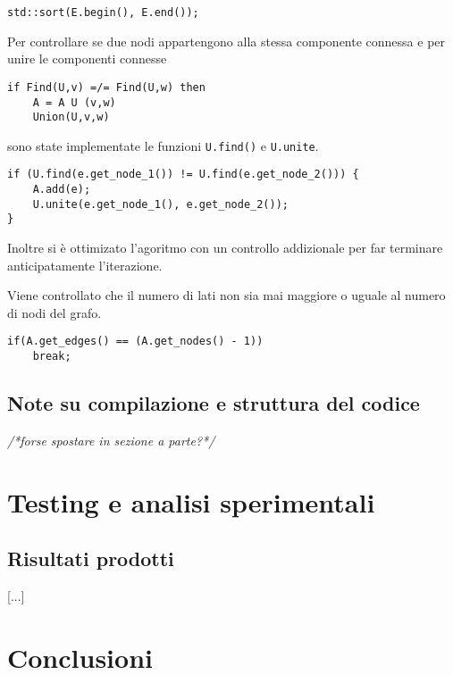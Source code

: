 \documentclass[]{article}
\begin{document}
\begin{flushleft}
\lstset{language=c++, style=mystyle, firstnumber=2} 	 	
\begin{lstlisting}
std::sort(E.begin(), E.end());
\end{lstlisting}

\medskip
Per controllare se due nodi appartengono alla stessa componente connessa e per unire le componenti connesse
\begin{lstlisting}
if Find(U,v) =/= Find(U,w) then
	A = A U (v,w)
	Union(U,v,w)
\end{lstlisting}

\smallskip
sono state implementate le funzioni \verb|U.find()| e \verb|U.unite|.

\lstset{language=c++, style=mystyle, firstnumber=2} 	 	
\begin{lstlisting}
if (U.find(e.get_node_1()) != U.find(e.get_node_2())) {
	A.add(e);
    U.unite(e.get_node_1(), e.get_node_2());
}
\end{lstlisting}

\medskip
Inoltre si è ottimizato l'agoritmo con un controllo addizionale per far terminare anticipatamente l'iterazione. 

Viene controllato che il numero di lati non sia mai maggiore o uguale al numero di nodi del grafo.

\lstset{language=c++, style=mystyle, firstnumber=6}
\begin{lstlisting}
if(A.get_edges() == (A.get_nodes() - 1))
    break;
\end{lstlisting}
\end{flushleft}
\subsection{Note su compilazione e struttura del codice}
\textit{/*forse spostare in sezione a parte?*/}
\section{Testing e analisi sperimentali}
\subsection{Risultati prodotti}
[...]
\section{Conclusioni}
\end{document}
